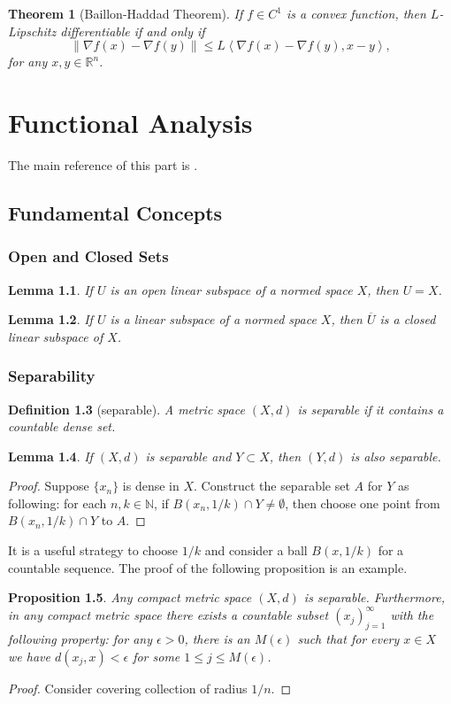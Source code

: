 \documentclass[12pt,a4paper]{report}
\numberwithin{equation}{section}
\theoremstyle{mystyle}
\newtheorem{definition}{Definition}[section]
\newtheorem{theorem}[definition]{Theorem}
\newtheorem{lemma}[definition]{Lemma}
\newtheorem{proposition}[definition]{Proposition}
\newcommand{\R}{\mathbb{R}}
\newcommand{\N}{\mathbb{N}}
\newcommand{\grad}{\nabla}
\newcommand{\norm}[1]{\left\lVert #1 \right\rVert}
\newcommand{\inner}[1]{\left\langle #1 \right\rangle}
\begin{document}
	\begin{theorem}[Baillon-Haddad Theorem]
		If $f\in C^1$ is a convex function, then $L$-Lipschitz differentiable if and only if
		$$
		\norm{\grad f(x)-\grad f(y)}\leq L\inner{\grad f(x)-\grad f(y),x-y},
		$$
		for any $x,y\in \R^n$.
	\end{theorem}
	
	
	
	\part{Functional Analysis}
	The main reference of this part is \cite{robinson_2020}.
	
	\chapter{Fundamental Concepts}
	\section{Open and Closed Sets}
	\begin{lemma}
		If $U$ is an open linear subspace of a normed space $X$, then $U=X$.
	\end{lemma}
	
	\begin{lemma}
		If $U$ is a linear subspace of a normed space $X$, then $\overline{U}$ is a closed linear subspace of $X$.
	\end{lemma}
	
	
	
	
	\section{Separability}
	\begin{definition}[separable]
		A metric space $(X,d)$ is \emph{separable} if it contains a countable dense set.
	\end{definition}
	\begin{lemma}
		If $(X,d)$ is separable and $Y\subset X$, then $(Y,d)$ is also separable. 
	\end{lemma}
	\begin{proof}
		Suppose $\{x_n\}$ is dense in $X$. Construct the separable set $A$ for $Y$ as following: for each $n,k\in \N$, if $B(x_n,1/k)\cap Y\neq \emptyset$, then choose one point from $B(x_n,1/k)\cap Y$ to $A$.
	\end{proof}
	It is a useful strategy to choose $1/k$ and consider a ball $B(x,1/k)$ for a countable sequence. The proof of the following proposition is an example.
	\begin{proposition}
		Any compact metric space $(X,d)$ is separable. Furthermore, in any compact metric space there exists a countable subset $(x_j)_{j=1}^\infty$ with the following property: for any $\epsilon>0$, there is an $M(\epsilon)$ such that for every $x\in X$ we have $d(x_j,x)<\epsilon$ for some $1\leq j \leq M(\epsilon)$.
	\end{proposition}
	\begin{proof}
		Consider covering collection of radius $1/n$.
	\end{proof}
	
\end{document}
